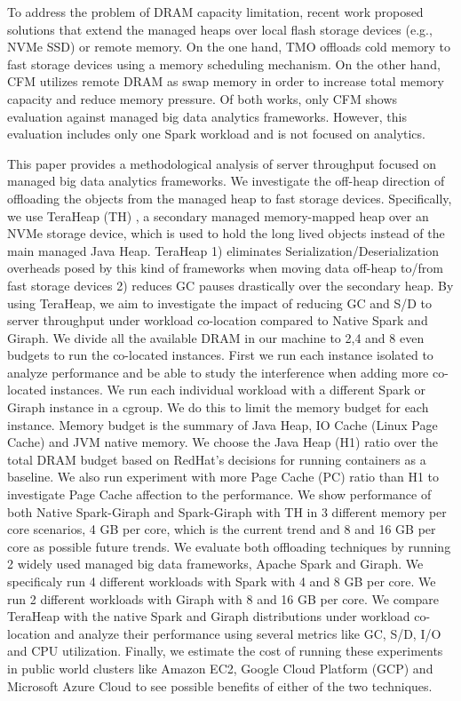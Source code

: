 To address the problem of DRAM capacity limitation, recent work
proposed solutions that extend the managed heaps over local flash
storage devices (e.g., NVMe SSD) or remote memory. On the one hand,
TMO \cite{TMO} offloads cold memory to fast storage devices using
a memory scheduling mechanism. On the other hand, CFM \cite{CFM}
utilizes remote DRAM as swap memory in order to increase total memory capacity
and reduce memory pressure. Of both works, only CFM shows
evaluation against managed big data analytics frameworks. However, this evaluation
includes only one Spark workload and is not focused on analytics.

This paper provides a methodological analysis of server throughput 
focused on managed big data analytics frameworks.
We investigate the off-heap direction of offloading the objects from the
managed heap to fast storage devices.
Specifically, we use TeraHeap (TH) \cite{TeraHeap}, a secondary managed
memory-mapped heap over an NVMe storage device, which is used to hold
the long lived objects instead of the main managed Java Heap. TeraHeap
1) eliminates Serialization/Deserialization overheads posed by this
kind of frameworks when moving data off-heap to/from fast storage
devices 2) reduces GC pauses drastically over the secondary heap. By
using TeraHeap, we aim to investigate the impact of reducing GC and S/D
to server throughput under workload co-location compared to Native Spark
and Giraph. We divide all the available DRAM
in our machine to 2,4 and 8 even budgets to run the co-located instances.
First we run each instance isolated to analyze performance and be able to study the interference when adding more
co-located instances. We run each individual workload with a different Spark or Giraph instance in a cgroup.
We do this to limit the memory budget for each instance. Memory budget is
the summary of Java Heap, IO Cache (Linux Page Cache) and JVM native memory. We choose
the Java Heap (H1) ratio over the total DRAM budget based on RedHat's decisions
for running containers as a baseline. We also run experiment with more Page Cache (PC) ratio than H1
to investigate Page Cache affection to the performance. We show performance of both Native Spark-Giraph and Spark-Giraph with TH in 3 different
memory per core scenarios, 4 GB per core, which is the current trend and 8 and 16 GB per core 
as possible future trends. We evaluate both offloading techniques by running 2 widely used
managed big data frameworks, Apache Spark and Giraph. We
specificaly run 4 different workloads with Spark with 4 and 8 GB per core.
We run 2 different workloads with Giraph with 8 and 16 GB per core.
We compare TeraHeap with the native Spark and Giraph distributions under workload
co-location and analyze their performance using several metrics like
GC, S/D, I/O and CPU utilization. Finally, we estimate the cost of running these
experiments in public world clusters like Amazon EC2, Google Cloud Platform (GCP)
and Microsoft Azure Cloud to see possible benefits of either of the two techniques.


